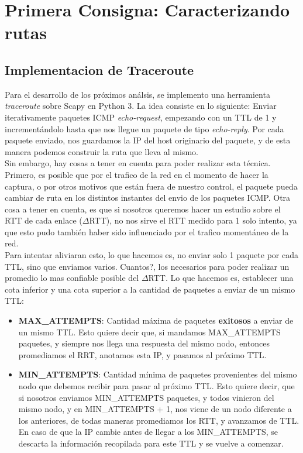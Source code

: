 \section{Primera Consigna: Caracterizando rutas}

\subsection{Implementacion de Traceroute}

Para el desarrollo de los próximos análsis, se implemento una herramienta \textit{traceroute} sobre Scapy en Python 3. La idea consiste en lo siguiente: Enviar iterativamente paquetes ICMP \textit{echo-request}, empezando con un TTL de 1 y incrementándolo hasta que nos llegue un paquete de tipo \textit{echo-reply}. Por cada paquete enviado, nos guardamos la IP del host originario del paquete, y de esta manera podemos construir la ruta que lleva al mismo. \\

Sin embargo, hay cosas a tener en cuenta para poder realizar esta técnica. Primero, es posible que por el trafico de la red en el momento de hacer la captura, o por otros motivos que están fuera de nuestro control, el paquete pueda cambiar de ruta en los distintos instantes del envio de los paquetes ICMP. Otra cosa a tener en cuenta, es que si nosotros queremos hacer un estudio sobre el RTT de cada enlace ($\Delta$RTT), no nos sirve el RTT medido para 1 solo intento, ya que esto pudo también haber sido influenciado por el trafico momentáneo de la red.\\

Para intentar aliviaran esto, lo que hacemos es, no enviar solo 1 paquete por cada TTL, sino que enviamos varios. Cuantos?, los necesarios para poder realizar un promedio lo mas confiable posible del $\Delta$RTT. Lo que hacemos es, establecer una cota inferior y una cota superior a la cantidad de paquetes a enviar de un mismo TTL:

\begin{itemize}
	\item \textbf{MAX\_ATTEMPTS}: Cantidad máxima de paquetes \textbf{exitosos} a enviar de un mismo TTL. Esto quiere decir que, si mandamos MAX\_ATTEMPTS paquetes, y siempre nos llega una respuesta del mismo nodo, entonces promediamos el RRT, anotamos esta IP, y pasamos al próximo TTL.
	\item \textbf{MIN\_ATTEMPTS}: Cantidad mínima de paquetes provenientes del mismo nodo que debemos recibir para pasar al próximo TTL. Esto quiere decir, que si nosotros enviamos MIN\_ATTEMPTS paquetes, y todos vinieron del mismo nodo, y en MIN\_ATTEMPTS + 1, nos viene de un nodo diferente a los anteriores, de todas maneras promediamos los RTT, y avanzamos de TTL. En caso de que la IP cambie antes de llegar a los MIN\_ATTEMPTS, se descarta la información recopilada para este TTL y se vuelve a comenzar.
\end{itemize}


